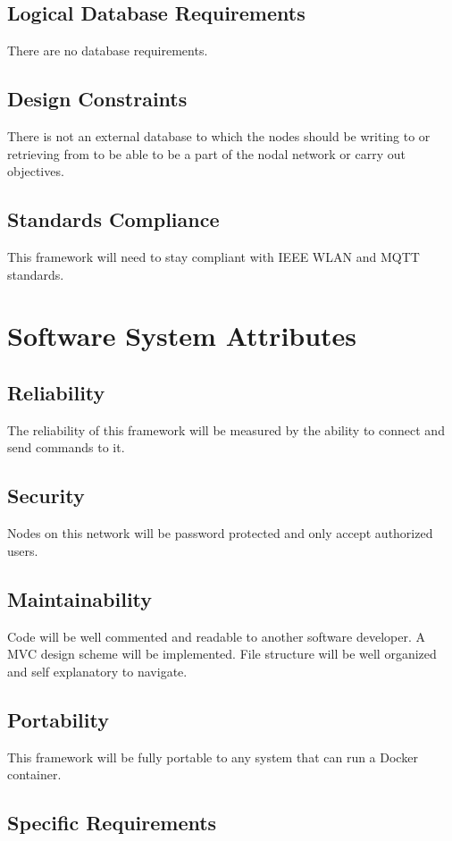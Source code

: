\documentclass[draftclsnofoot, onecolumn, compsoc, 10pt]{IEEEtran}
\begin{document}
\subsection{Logical Database Requirements}
There are no database requirements. 

\subsection{Design Constraints}
There is not an external database to which the nodes should be writing to or retrieving from to be able to be a part of the nodal network or carry out objectives.

\subsection{Standards Compliance}
This framework will need to stay compliant with IEEE WLAN and MQTT standards.

\section{Software System Attributes}
\subsection{Reliability}
The reliability of this framework will be measured by the ability to connect and send commands to it. 

\subsection{Security}
Nodes on this network will be password protected and only accept authorized users.

\subsection{Maintainability}
Code will be well commented and readable to another software developer. A MVC design scheme will be implemented. File structure will be well organized and self explanatory to navigate.


\subsection{Portability}
This framework will be fully portable to any system that can run a Docker container. 

\subsection{Specific Requirements}
\end{document}
